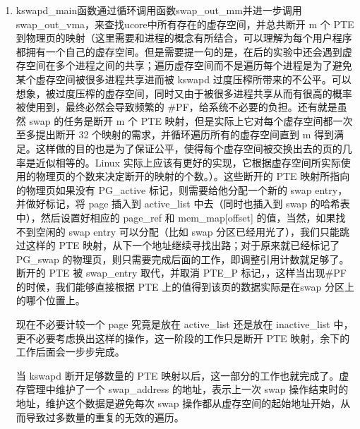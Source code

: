 \begin{enumerate}
\def\labelenumi{\arabic{enumi}.}
\item
  kswapd\_main函数通过循环调用函数swap\_out\_mm并进一步调用swap\_out\_vma，来查找ucore中所有存在的虚存空间，并总共断开
  m 个 PTE
  到物理页的映射（这里需要和进程的概念有所结合，可以理解为每个用户程序都拥有一个自己的虚存空间。但是需要提一句的是，在后的实验中还会遇到虚存空间在多个进程之间的共享；遍历虚存空间而不是遍历每个进程是为了避免某个虚存空间被很多进程共享进而被
  kswapd
  过度压榨所带来的不公平。可以想象，被过度压榨的虚存空间，同时又由于被很多进程共享从而有很高的概率被使用到，最终必然会导致频繁的
  \#PF，给系统不必要的负担。还有就是虽然 swap 的任务是断开 m 个 PTE
  映射，但是实际上它对每个虚存空间都一次至多提出断开 32
  个映射的需求，并循环遍历所有的虚存空间直到 m
  得到满足。这样做的目的也是为了保证公平，使得每个虚存空间被交换出去的页的几率是近似相等的。Linux
  实际上应该有更好的实现，它根据虚存空间所实际使用的物理页的个数来决定断开的映射的个数。）。这些断开的
  PTE 映射所指向的物理页如果没有 PG\_active 标记，则需要给他分配一个新的
  swap entry，并做好标记，将 page 插入到 active\_list 中去（同时也插入到
  swap 的哈希表中），然后设置好相应的 page\_ref 和 mem\_map{[}offset{]}
  的值，当然，如果找不到空闲的 swap entry 可以分配（比如 swap
  分区已经用光了），我们只能跳过这样的 PTE
  映射，从下一个地址继续寻找出路；对于原来就已经标记了 PG\_swap
  的物理页，则只需要完成后面的工作，即调整引用计数就足够了。断开的 PTE
  被 swap\_entry 取代，并取消 PTE\_P
  标记，，这样当出现\#PF的时候，我们能够直接根据 PTE
  上的值得到该页的数据实际是在swap 分区上的哪个位置上。

  现在不必要计较一个 page 究竟是放在 active\_list 还是放在
  inactive\_list 中，更不必要考虑换出这样的操作，这一阶段的工作只是断开
  PTE 映射，余下的工作后面会一步步完成。

  当 kswapd 断开足够数量的 PTE
  映射以后，这一部分的工作也就完成了。虚存管理中维护了一个 swap\_address
  的地址，表示上一次 swap 操作结束时的地址，维护这个数据是避免每次 swap
  操作都从虚存空间的起始地址开始，从而导致过多数量的重复的无效的遍历。


\end{enumerate}
